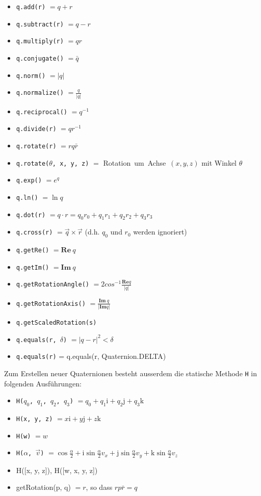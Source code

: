 \documentclass[12pt]{article}
\begin{document}
  \begin{itemize}
    \item \texttt{q.add(r)} $= q + r$
    \item \texttt{q.subtract(r)} $= q - r$
    \item \texttt{q.multiply(r)} $= q r$
    \item \texttt{q.conjugate()} $= \bar{q}$
    \item \texttt{q.norm()} $= \lvert q \rvert$
    \item \texttt{q.normalize()} $= \frac{q}{\lvert q \rvert}$
    \item \texttt{q.reciprocal()} $= q^{-1}$
    \item \texttt{q.divide(r)} $= q r^{-1}$
    \item \texttt{q.rotate(r)} $= r q \bar{r}$
    \item \texttt{q.rotate($\theta$, x, y, z)} $=$ Rotation\ um\ Achse\ $(x, y, z)$ mit Winkel $\theta$
    \item \texttt{q.exp()} $= e^q$
    \item \texttt{q.ln()} $= \ln q$
    \item \texttt{q.dot(r)} $= q \cdot r = q_0 r_0 + q_1 r_1 + q_2 r_2 + q_3 r_3$
    \item \texttt{q.cross(r)} $= \vec{q} \times \vec{r}$ (d.h. $q_0$ und $r_0$ werden ignoriert)
    \item \texttt{q.getRe()} $= \mathbf{Re}\ q$
    \item \texttt{q.getIm()} $= \mathbf{Im}\ q$
    \item \texttt{q.getRotationAngle()} $= 2 cos^{-1}\frac{\mathbf{Re} q}{\lvert q \rvert}$
    \item \texttt{q.getRotationAxis()} $= \frac{\mathbf{Im}\ q}{\lvert \mathbf{Im} q \rvert}$
    \item \texttt{q.getScaledRotation(s)}
    \item \texttt{q.equals(r, $\delta$)} $= |q - r|^2 < \delta$
    \item \texttt{q.equals(r)} = q.equals(r, Quaternion.DELTA)
  \end{itemize}

  Zum Erstellen neuer Quaternionen besteht ausserdem die statische Methode \texttt{H} in folgenden Ausführungen:
  \begin{itemize}
    \item \texttt{H($q_0$, $q_1$, $q_2$, $q_3$)} $= q_0 + q_1 \mathrm{i} + q_2 \mathrm{j} + q_3 \mathrm{k}$
    \item \texttt{H(x, y, z)} $= x \mathrm{i} + y \mathrm{j} + z \mathrm{k}$
    \item \texttt{H(w)} $= w$
    \item \texttt{H($\alpha$, $\vec{v}$)} $= \cos\frac{\alpha}{2} + \mathrm{i} \sin\frac{\alpha}{2} v_x + \mathrm{j} \sin\frac{\alpha}{2} v_y + \mathrm{k} \sin\frac{\alpha}{2} v_z$
    \item H([x, y, z]), H([w, x, y, z])
    \item getRotation(p, q) $= r$, so dass $r p \bar{r} = q$
  \end{itemize}
\end{document}
